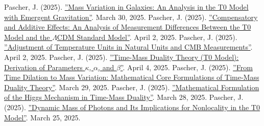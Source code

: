 \documentclass[a4paper,12pt]{article}
\theoremstyle{definition}
\theoremstyle{remark}
\begin{document}
	\begin{thebibliography}{99}
		 Pascher, J. (2025). \href{https://github.com/jpascher/T0-Time-Mass-Duality/tree/main/2/pdf/English/MassVarGalaxienEn.pdf}{''Mass Variation in Galaxies: An Analysis in the T0 Model with Emergent Gravitation''}. March 30, 2025.
		 Pascher, J. (2025). \href{https://github.com/jpascher/T0-Time-Mass-Duality/tree/main/2/pdf/English/MessdifferenzenT0StandardEn.pdf}{''Compensatory and Additive Effects: An Analysis of Measurement Differences Between the T0 Model and the \(\Lambda\)CDM Standard Model''}. April 2, 2025.
		 Pascher, J. (2025). \href{https://github.com/jpascher/T0-Time-Mass-Duality/tree/main/2/pdf/English/NatEinheitenAlpha1En.pdf}{''Adjustment of Temperature Units in Natural Units and CMB Measurements''}. April 2, 2025.
		 Pascher, J. (2025). \href{https://github.com/jpascher/T0-Time-Mass-Duality/tree/main/2/pdf/English/ZeitMasseT0ParamsEn.pdf}{''Time-Mass Duality Theory (T0 Model): Derivation of Parameters \(\kappa\), \(\alpha\), and \(\beta\)''}. April 4, 2025.
		 Pascher, J. (2025). \href{https://github.com/jpascher/T0-Time-Mass-Duality/tree/main/2/pdf/English/MathZeitMasseLagrange.pdf}{''From Time Dilation to Mass Variation: Mathematical Core Formulations of Time-Mass Duality Theory''}. March 29, 2025.
		 Pascher, J. (2025). \href{https://github.com/jpascher/T0-Time-Mass-Duality/tree/main/2/pdf/English/MathHiggsZeitMasseEn.pdf}{''Mathematical Formulation of the Higgs Mechanism in Time-Mass Duality''}. March 28, 2025.
		 Pascher, J. (2025). \href{https://github.com/jpascher/T0-Time-Mass-Duality/tree/main/2/pdf/English/DynMassePhotonenNichtlokalEn.pdf}{''Dynamic Mass of Photons and Its Implications for Nonlocality in the T0 Model''}. March 25, 2025.
	\end{thebibliography}
	
\end{document}
